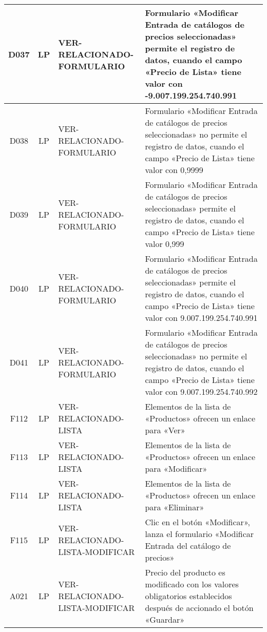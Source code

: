 \begin{landscape}
{\begin{longtable}[htb]{|c|c|p{3.8cm}|p{15.2cm}|}
\scriptsize{D037} & \scriptsize{LP} & \scriptsize{VER-RELACIONADO-FORMULARIO} & \scriptsize{Formulario «Modificar Entrada de catálogos de precios seleccionadas» permite el registro de datos, cuando el campo «Precio de Lista» tiene valor con -9.007.199.254.740.991} \\ \hline
\scriptsize{D038} & \scriptsize{LP} & \scriptsize{VER-RELACIONADO-FORMULARIO} & \scriptsize{Formulario «Modificar Entrada de catálogos de precios seleccionadas» no permite el registro de datos, cuando el campo «Precio de Lista» tiene valor con 0,9999} \\ \hline
\scriptsize{D039} & \scriptsize{LP} & \scriptsize{VER-RELACIONADO-FORMULARIO} & \scriptsize{Formulario «Modificar Entrada de catálogos de precios seleccionadas» permite el registro de datos, cuando el campo «Precio de Lista» tiene valor 0,999} \\ \hline
\scriptsize{D040} & \scriptsize{LP} & \scriptsize{VER-RELACIONADO-FORMULARIO} & \scriptsize{Formulario «Modificar Entrada de catálogos de precios seleccionadas» permite el registro de datos, cuando el campo «Precio de Lista» tiene valor con 9.007.199.254.740.991} \\ \hline
\scriptsize{D041} & \scriptsize{LP} & \scriptsize{VER-RELACIONADO-FORMULARIO} & \scriptsize{Formulario «Modificar Entrada de catálogos de precios seleccionadas» no permite el registro de datos, cuando el campo «Precio de Lista» tiene valor con 9.007.199.254.740.992} \\ \hline
\scriptsize{F112} & \scriptsize{LP} & \scriptsize{VER-RELACIONADO-LISTA} & \scriptsize{Elementos de la lista de «Productos» ofrecen un enlace para «Ver»} \\ \hline
\scriptsize{F113} & \scriptsize{LP} & \scriptsize{VER-RELACIONADO-LISTA} & \scriptsize{Elementos de la lista de «Productos» ofrecen un enlace para «Modificar»} \\ \hline
\scriptsize{F114} & \scriptsize{LP} & \scriptsize{VER-RELACIONADO-LISTA} & \scriptsize{Elementos de la lista de «Productos» ofrecen un enlace para «Eliminar»} \\ \hline
\scriptsize{F115} & \scriptsize{LP} & \scriptsize{VER-RELACIONADO-LISTA-MODIFICAR} & \scriptsize{Clic en el botón «Modificar», lanza el formulario «Modificar Entrada del catálogo de precios»} \\ \hline
\scriptsize{A021} & \scriptsize{LP} & \scriptsize{VER-RELACIONADO-LISTA-MODIFICAR} & \scriptsize{Precio del producto es modificado con los valores obligatorios establecidos después de accionado el botón «Guardar»} \\ \hline

\end{longtable}}
\end{landscape}
